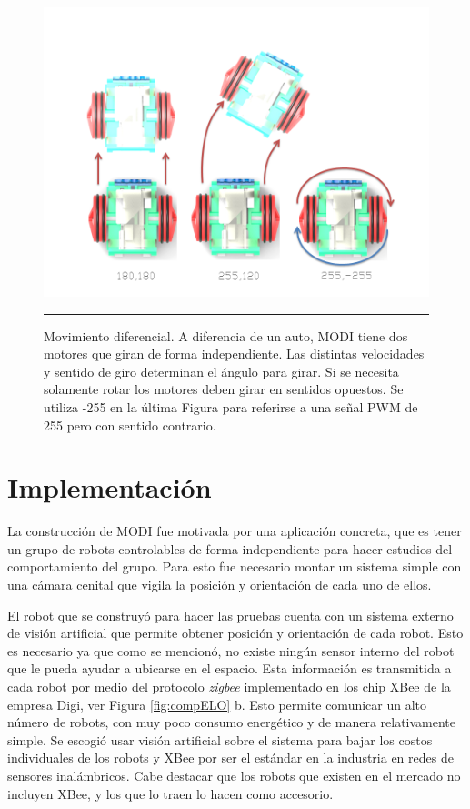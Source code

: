 \begin{figure}[htbp]
	\centering
		\includegraphics[width=\textwidth]{./Figures/MODI/pwm.png}
		\rule{35em}{0.5pt}
	\caption[Señal PWM]{Movimiento diferencial. A diferencia de un auto, MODI tiene dos motores que giran de forma independiente. Las distintas velocidades y sentido de giro determinan el ángulo para girar. Si se necesita solamente rotar los motores deben girar en sentidos opuestos. Se utiliza -255 en la última Figura para referirse a una señal PWM de 255 pero con sentido contrario.}
	\label{fig:pwm}
\end{figure}

\section{Implementación}
La construcción de MODI fue motivada por una aplicación concreta, que es tener un grupo de robots controlables de forma independiente para hacer estudios del comportamiento del grupo. Para esto fue necesario montar un sistema simple con una cámara cenital que vigila  la posición y orientación de cada uno de ellos.

El robot que se construyó para hacer las pruebas cuenta con un sistema externo de visión artificial que permite obtener posición y orientación de cada robot. Esto es necesario ya que como se mencionó, no existe ningún sensor interno del robot que le pueda ayudar a ubicarse en el espacio. Esta información es transmitida a cada robot por medio del protocolo \textit{zigbee} implementado en los chip XBee de la empresa Digi, ver Figura \ref{fig:compELO} b. Esto permite comunicar un alto número de robots, con muy poco consumo energético y de manera relativamente simple. Se escogió usar visión artificial sobre el sistema para bajar los costos individuales de los robots y XBee por ser el estándar en la industria en redes de sensores inalámbricos. Cabe destacar que los robots que existen en el mercado no incluyen XBee, y los que lo traen lo hacen como accesorio. 


